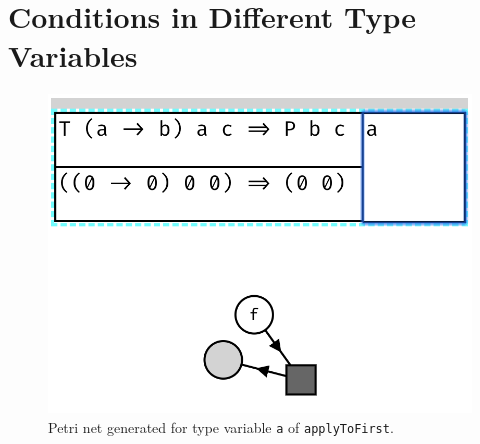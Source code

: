 \documentclass[11pt,openright,hidelinks,a4paper]{article}
\begin{document}
\setcounter{page}{1}


\newpage

\newpage

\newpage

\newpage

\newpage

\newpage


\newpage



\newpage

\appendix

\section{Conditions in Different Type Variables}\label{app:differentvars}

\begin{figure}[H]
\begin{center}
\includegraphics[scale=0.45]{applytofirsta}
\end{center}
\caption{Petri net generated for type variable \lstinline{a} of \lstinline{applyToFirst}.}
\label{fig:applyToFirstA}
\end{figure}
\end{document}
